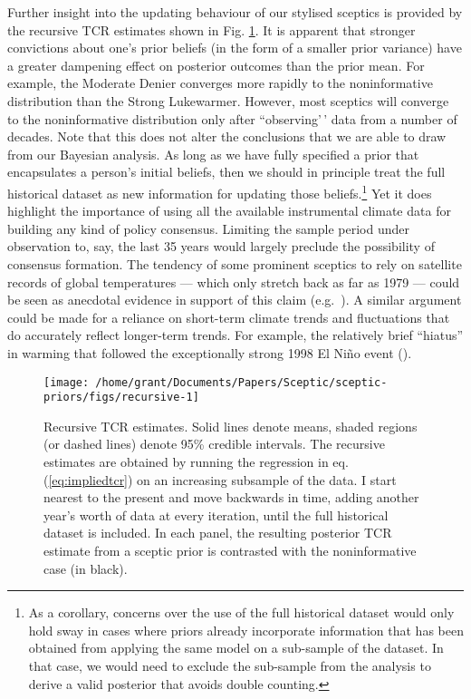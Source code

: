 \documentclass[smallextended]{svjour3}       %
\begin{document}
Further insight into the updating behaviour of our stylised sceptics is
provided by the recursive TCR estimates shown in Fig.
\ref{fig:recursive}. It is apparent that stronger convictions about
one's prior beliefs (in the form of a smaller prior variance) have a
greater dampening effect on posterior outcomes than the prior mean. For
example, the Moderate Denier converges more rapidly to the
noninformative distribution than the Strong Lukewarmer. However, most
sceptics will converge to the noninformative distribution only after
``observing'\,' data from a number of decades. Note that this does not
alter the conclusions that we are able to draw from our Bayesian
analysis. As long as we have fully specified a prior that encapsulates a
person's initial beliefs, then we should in principle treat the full
historical dataset as new information for updating those
beliefs.\footnote{As a corollary, concerns over the use of the full
  historical dataset would only hold sway in cases where priors already
  incorporate information that has been obtained from applying the same
  model on a sub-sample of the dataset. In that case, we would need to
  exclude the sub-sample from the analysis to derive a valid posterior
  that avoids double counting.} Yet it does highlight the importance of
using all the available instrumental climate data for building any kind
of policy consensus. Limiting the sample period under observation to,
say, the last 35 years would largely preclude the possibility of
consensus formation. The tendency of some prominent sceptics to rely on
satellite records of global temperatures --- which only stretch back as
far as 1979 --- could be seen as anecdotal evidence in support of this
claim (e.g.~\cite{mooney2016cruz}). A similar argument could be made for
a reliance on short-term climate trends and fluctuations that do
accurately reflect longer-term trends. For example, the relatively brief
``hiatus'' in warming that followed the exceptionally strong 1998 El
Niño event (\cite{lewandowsky2016pause}).

\begin{figure}

{\centering \texttt{[image: /home/grant/Documents/Papers/Sceptic/sceptic-priors/figs/recursive-1]} 

}

\caption{Recursive TCR estimates. Solid lines denote means, shaded regions (or dashed lines) denote 95\% credible intervals. The recursive estimates are obtained by running the regression in eq. (\ref{eq:impliedtcr}) on an increasing subsample of the data. I start nearest to the present and move backwards in time, adding another year's worth of data at every iteration, until the full historical dataset is included. In each panel, the resulting posterior TCR estimate from a sceptic prior is contrasted with the noninformative case (in black).}\label{fig:recursive}
\end{figure}
\end{document}
